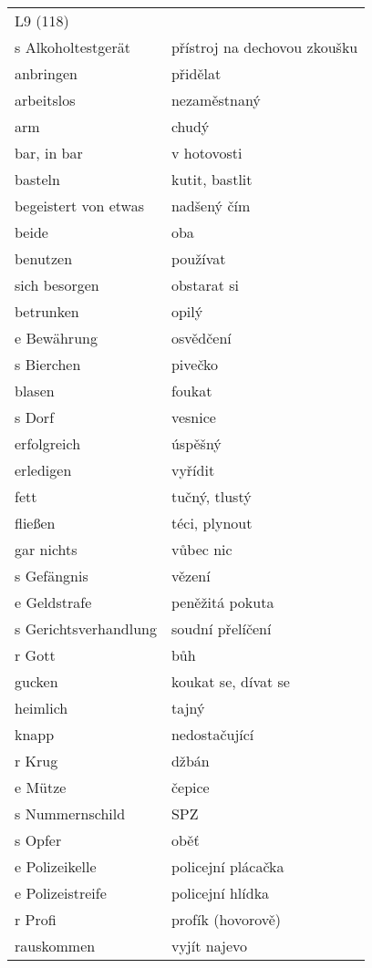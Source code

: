 \documentclass{article}
\begin{document}
\begin{tabular}{ p{5cm}|p{5cm}  }
    \\
    L9 (118) \\
    s Alkoholtestgerät & přístroj na dechovou zkoušku\\
    anbringen & přidělat\\
    arbeitslos & nezaměstnaný\\
    arm & chudý\\
    bar, in bar & v hotovosti\\
    basteln & kutit, bastlit\\
    begeistert von etwas & nadšený čím\\
    beide & oba\\
    benutzen & používat\\
    sich besorgen & obstarat si\\
    betrunken & opilý\\
    e Bewährung & osvědčení\\
    s Bierchen & pivečko\\
    blasen & foukat\\
    s Dorf & vesnice\\
    erfolgreich & úspěšný\\
    erledigen & vyřídit\\
    fett & tučný, tlustý\\
    flie{\ss}en & téci, plynout\\
    gar nichts & vůbec nic\\
    s Gefängnis & vězení\\
    e Geldstrafe & peněžitá pokuta\\
    s Gerichtsverhandlung & soudní přelíčení\\
    r Gott & bůh\\
    gucken & koukat se, dívat se\\
    heimlich & tajný\\
    knapp & nedostačující\\
    r Krug & džbán\\
    e Mütze & čepice\\
    s Nummernschild & SPZ\\
    s Opfer & oběť\\
    e Polizeikelle & policejní plácačka\\
    e Polizeistreife & policejní hlídka\\
    r Profi & profík (hovorově)\\
    rauskommen & vyjít najevo\\

\end{tabular}
\end{document}
